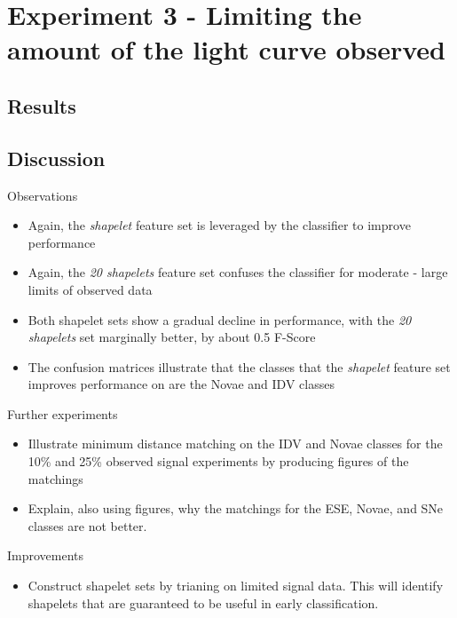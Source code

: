 
\clearpage

\section{Experiment 3 - Limiting the amount of the light curve observed}
\subsection{Results}

\clearpage
\subsection{Discussion}
Observations
\begin{itemize}
	\item Again, the \emph{shapelet} feature set is leveraged by the classifier to improve performance
	\item Again, the \emph{20 shapelets} feature set confuses the classifier for moderate - large limits of observed data
	\item Both shapelet sets show a gradual decline in performance, with the \emph{20 shapelets} set marginally better, by about 0.5 F-Score
	\item The confusion matrices illustrate that the classes that the \emph{shapelet} feature set improves performance on are the Novae and IDV classes
\end{itemize}
Further experiments
\begin{itemize}
	\item Illustrate minimum distance matching on the IDV and Novae classes for the 10\% and 25\% observed signal experiments by producing figures of the matchings
	\item Explain, also using figures, why the matchings for the ESE, Novae, and SNe classes are not better.
\end{itemize}
Improvements
\begin{itemize}
	\item Construct shapelet sets by trianing on limited signal data. This will identify shapelets that are guaranteed to be useful in early classification.
\end{itemize}

